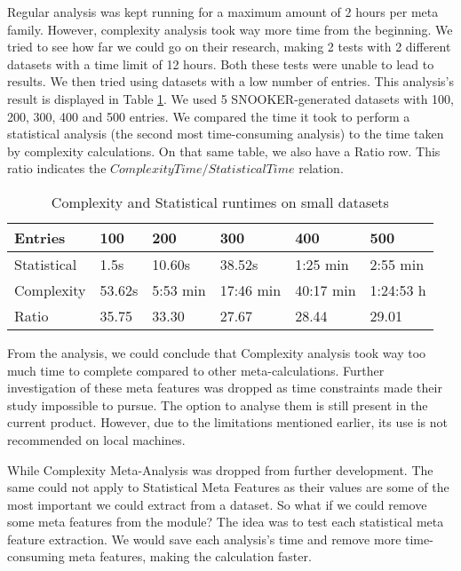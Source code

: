 Regular analysis was kept running for a maximum amount of 2 hours per meta family. However, complexity analysis took way more time from the beginning. We tried to see how far we could go on their research, making 2 tests with 2 different datasets with a time limit of 12 hours. Both these tests were unable to lead to results. We then tried using datasets with a low number of entries. This analysis's result is displayed in Table \ref{tab:small_analysis_time}. We used 5 SNOOKER-generated datasets with 100, 200, 300, 400 and 500 entries. We compared the time it took to perform a statistical analysis (the second most time-consuming analysis) to the time taken by complexity calculations. On that same table, we also have a Ratio row. This ratio indicates the $ComplexityTime/StatisticalTime$ relation.
\begin{table}[b]
  \centering
  \caption{Complexity and Statistical runtimes on small datasets}
  \setlength{\tabcolsep}{8pt}
    \renewcommand{\arraystretch}{1.2}
      \begin{tabular}{llllll}
        \hline
        Entries     & 100       & 200       & 300       & 400       & 500 \\ \hline
        Statistical & 1.5s      & 10.60s    & 38.52s    & 1:25 min  & 2:55 min \\
        Complexity  & 53.62s    & 5:53 min  & 17:46 min & 40:17 min  & 1:24:53 h \\\hline\hline
        Ratio       & 35.75     & 33.30     & 27.67     & 28.44     & 29.01\\\hline
  \end{tabular}
  \label{tab:small_analysis_time}
\end{table}

From the analysis, we could conclude that Complexity analysis took way too much time to complete compared to other meta-calculations. Further investigation of these meta features was dropped as time constraints made their study impossible to pursue. The option to analyse them is still present in the current product. However, due to the limitations mentioned earlier, its use is not recommended on local machines.

While Complexity Meta-Analysis was dropped from further development. The same could not apply to Statistical Meta Features as their values are some of the most important we could extract from a dataset. So what if we could remove some meta features from the module? The idea was to test each statistical meta feature extraction. We would save each analysis's time and remove more time-consuming meta features, making the calculation faster. 

